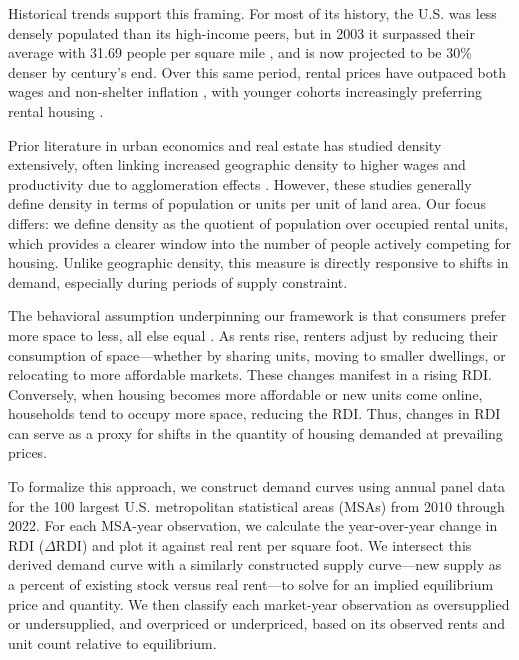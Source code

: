 \documentclass[APA,Times1COL]{WileyNJDv5} %
\begin{document}
Historical trends support this framing. For most of its history, the U.S. was less densely populated than its high-income peers, but in 2003 it surpassed their average with 31.69 people per square mile \cite{ourworldindataPopulationDensity}, and is now projected to be 30\% denser by century’s end. Over this same period, rental prices have outpaced both wages and non-shelter inflation \cite{feiveson2024rent, stlouisfedConsumerPrice}, with younger cohorts increasingly preferring rental housing \cite{fanniemaeConsumersFeeling}.

Prior literature in urban economics and real estate has studied density extensively, often linking increased geographic density to higher wages and productivity due to agglomeration effects \cite{titman2024city, liu2018vertical}. However, these studies generally define density in terms of population or units per unit of land area. Our focus differs: we define density as the quotient of population over occupied rental units, which provides a clearer window into the number of people actively competing for housing. Unlike geographic density, this measure is directly responsive to shifts in demand, especially during periods of supply constraint.

The behavioral assumption underpinning our framework is that consumers prefer more space to less, all else equal \cite{molloy2022housing, muth1969cities}. As rents rise, renters adjust by reducing their consumption of space---whether by sharing units, moving to smaller dwellings, or relocating to more affordable markets. These changes manifest in a rising RDI. Conversely, when housing becomes more affordable or new units come online, households tend to occupy more space, reducing the RDI. Thus, changes in RDI can serve as a proxy for shifts in the quantity of housing demanded at prevailing prices.

To formalize this approach, we construct demand curves using annual panel data for the 100 largest U.S. metropolitan statistical areas (MSAs) from 2010 through 2022. For each MSA-year observation, we calculate the year-over-year change in RDI (\( \Delta \text{RDI} \)) and plot it against real rent per square foot. We intersect this derived demand curve with a similarly constructed supply curve---new supply as a percent of existing stock versus real rent---to solve for an implied equilibrium price and quantity. We then classify each market-year observation as oversupplied or undersupplied, and overpriced or underpriced, based on its observed rents and unit count relative to equilibrium.
\end{document}
